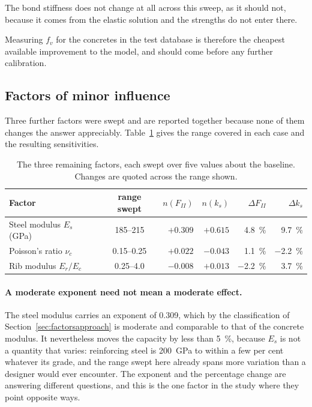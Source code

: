 The bond stiffness does not change at all across this sweep, as it should
not, because it comes from the elastic solution and the strengths do not
enter there.
 
Measuring $f_v$ for the concretes in the test database is therefore the
cheapest available improvement to the model, and should come before any
further calibration.

\subsection{Factors of minor influence}
\label{sec:matminor}
 
Three further factors were swept and are reported together because none of
them changes the answer appreciably. Table~\ref{tab:sweepminor} gives the
range covered in each case and the resulting sensitivities.
 
\begin{table}[H]
\centering
\caption{The three remaining factors, each swept over five values about
         the baseline. Changes are quoted across the range shown.}
\label{tab:sweepminor}
\small
\begin{tabular*}{\linewidth}{@{\extracolsep{\fill}}lcrrrr@{}}
\hline
Factor & range swept & $n(F_{II})$ & $n(k_s)$
       & $\Delta F_{II}$ & $\Delta k_s$ \\
\hline
Steel modulus $E_s$ (GPa) & 185--215   & $+0.309$ & $+0.615$
                          & \SI{+4.8}{\percent}  & \SI{+9.7}{\percent} \\
Poisson's ratio $\nu_c$   & 0.15--0.25 & $+0.022$ & $-0.043$
                          & \SI{+1.1}{\percent}  & \SI{-2.2}{\percent} \\
Rib modulus $E_r/E_c$     & 0.25--4.0  & $-0.008$ & $+0.013$
                          & \SI{-2.2}{\percent}  & \SI{+3.7}{\percent} \\
\hline
\end{tabular*}
\end{table}
 
\paragraph{A moderate exponent need not mean a moderate effect.}
The steel modulus carries an exponent of \num{0.309}, which by the
classification of Section~\ref{sec:factorsapproach} is moderate and
comparable to that of the concrete modulus. It nevertheless moves the
capacity by less than \SI{5}{\percent}, because $E_s$ is not a quantity
that varies: reinforcing steel is \SI{200}{\giga\pascal} to within a few
per cent whatever its grade, and the range swept here already spans more
variation than a designer would ever encounter. The exponent and the
percentage change are answering different questions, and this is the one
factor in the study where they point opposite ways.
 
